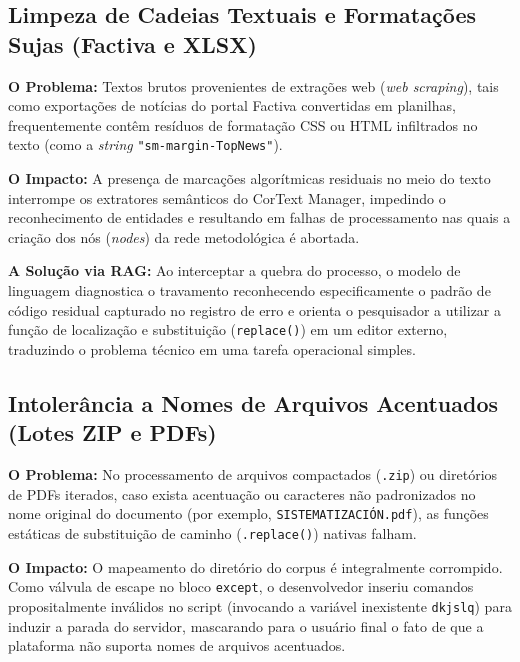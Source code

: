 \documentclass[
	oneside,
	a4paper,
	12pt,
	chapter=TITLE,
	section=TITLE,
	english,
	brazilian
]{abntex2}
\begin{document}
\begin{apendicesenv}
\FloatBarrier
\subsection{Limpeza de Cadeias Textuais e Formatações Sujas (Factiva e XLSX)}\label{sec:limpeza_de_cadeias_textuais_e_formatacoe}


\textbf{O Problema:} Textos brutos provenientes de extrações web (\textit{web scraping}), tais como exportações de notícias do portal Factiva convertidas em planilhas, frequentemente contêm resíduos de formatação CSS ou HTML infiltrados no texto (como a \textit{string} \texttt{"sm-margin-TopNews"}).

\textbf{O Impacto:} A presença de marcações algorítmicas residuais no meio do texto interrompe os extratores semânticos do CorText Manager, impedindo o reconhecimento de entidades e resultando em falhas de processamento nas quais a criação dos nós (\textit{nodes}) da rede metodológica é abortada.

\textbf{A Solução via RAG:} Ao interceptar a quebra do processo, o modelo de linguagem diagnostica o travamento reconhecendo especificamente o padrão de código residual capturado no registro de erro e orienta o pesquisador a utilizar a função de localização e substituição (\texttt{replace()}) em um editor externo, traduzindo o problema técnico em uma tarefa operacional simples.

\FloatBarrier
\subsection{Intolerância a Nomes de Arquivos Acentuados (Lotes ZIP e PDFs)}\label{sec:intolerancia_a_nomes_de_arquivos_acentua}


\textbf{O Problema:} No processamento de arquivos compactados (\texttt{.zip}) ou diretórios de PDFs iterados, caso exista acentuação ou caracteres não padronizados no nome original do documento (por exemplo, \texttt{SISTEMATIZACIÓN.\allowbreak pdf}), as funções estáticas de substituição de caminho (\texttt{.replace()}) nativas falham.

\textbf{O Impacto:} O mapeamento do diretório do corpus é integralmente corrompido. Como válvula de escape no bloco \texttt{except}, o desenvolvedor inseriu comandos propositalmente inválidos no script (invocando a variável inexistente \texttt{dkjslq}) para induzir a parada do servidor, mascarando para o usuário final o fato de que a plataforma não suporta nomes de arquivos acentuados.


\end{apendicesenv}
\end{document}
